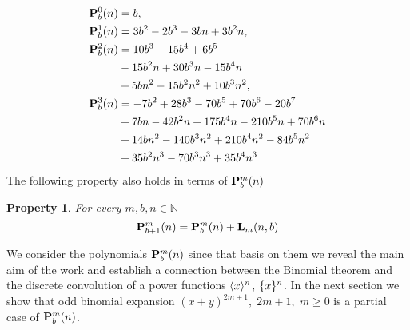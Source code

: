 \documentclass[12pt,letterpaper,oneside,reqno]{amsart}
\newcommand \anglePower [2]{\langle #1 \rangle \sp{#2}}
\newcommand \curvePower [2]{\{#1\}\sp{#2}}
\newcommand \polynomialP [4][P]{{\mathbf{#1}}\sp{#2} \sb{#3}(#4)}
\newcommand \polynomialL [4][L]{{\mathbf{#1}}\sb{#2}(#3,#4)}
\newtheorem{ppty}[thm]{Property}
\numberwithin{equation}{section}
\begin{document}
    \begin{equation*}
        \begin{split}
            \polynomialP{0}{b}{n}
            &=b, \\
            \polynomialP{1}{b}{n}
            &=3 b^2 - 2 b^3 - 3 b n + 3 b^2 n, \\
            \polynomialP{2}{b}{n}
            &=10 b^3 - 15 b^4 + 6 b^5 \\
            &- 15 b^2 n + 30 b^3 n - 15 b^4 n \\
            &+ 5 b n^2 - 15 b^2 n^2 + 10 b^3 n^2, \\
            \polynomialP{3}{b}{n}
            &=-7 b^2 + 28 b^3 - 70 b^5 + 70 b^6 - 20 b^7 \\
            &+ 7 b n - 42 b^2 n + 175 b^4 n - 210 b^5 n + 70 b^6 n \\
            &+ 14 b n^2 - 140 b^3 n^2 + 210 b^4 n^2 - 84 b^5 n^2 \\
            &+ 35 b^2 n^3 - 70 b^3 n^3 + 35 b^4 n^3
        \end{split}
    \end{equation*}
    The following property also holds in terms of $\polynomialP{m}{b}{n}$
    \begin{ppty}
        \label{prop_p_identity}
        For every $m,b,n \in \mathbb{N}$
        \begin{equation*}
            \polynomialP{m}{b+1}{n} = \polynomialP{m}{b}{n} + \polynomialL{m}{n}{b}
        \end{equation*}
    \end{ppty}
    We consider the polynomials $\polynomialP{m}{b}{n}$ since that basis on them we reveal the main aim of the work and establish a connection between the Binomial theorem and the discrete convolution of a power
    functions $\anglePower{x}{n}$, $\curvePower{x}{n}$.
    In the next section we show that odd binomial expansion $(x+y)^{2m+1}, \; 2m+1, \; m\geq 0$ is a partial case of $\polynomialP{m}{b}{n}$.
\end{document}
